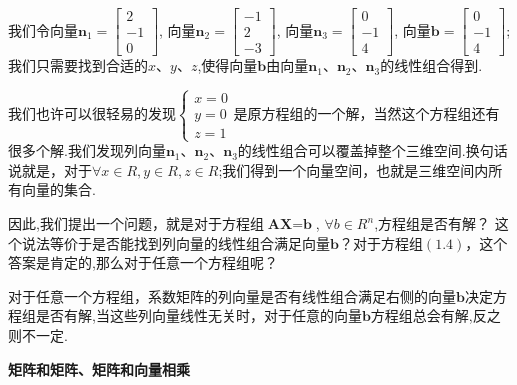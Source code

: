 \documentclass[oneside]{book}
\begin{document}
	我们令向量$
	\textbf{n}_{1}
	=
	\left[
	\begin{array}{c}
		2 \\
		-1\\
		0
	\end{array}
	\right]
	$,
	向量$
	\textbf{n}_{2}
	=
	\left[
	\begin{array}{c}
		-1 \\
		2\\
		-3
	\end{array}
	\right] 
	$,
	向量$
	\textbf{n}_{3}
	=
	\left[
	\begin{array}{c}
		0\\
		-1\\
		4
	\end{array}
	\right] 
	$,
	向量$
	\textbf{b}
	=
	\left[
	\begin{array}{c}
		0\\
		-1\\
		4
	\end{array}
	\right] 
	$;
	我们只需要找到合适的$x、y、z$,使得向量$\textbf{b}$由向量$\textbf{n}_{1}$、$\textbf{n}_{2}$、$\textbf{n}_{3}$的线性组合得到.
	
	我们也许可以很轻易的发现$ \left\{
	\begin{array}{c}
		x=0\\
		y=0\\
		z=1
	\end{array}
	\right. $是原方程组的一个解，当然这个方程组还有很多个解.我们发现列向量$\textbf{n}_{1}$、$\textbf{n}_{2}$、$\textbf{n}_{3}$的线性组合可以覆盖掉整个三维空间.换句话说就是，对于$ \forall x\in R,y\in R,z\in R$;我们得到一个向量空间，也就是三维空间内所有向量的集合.
	
	因此,我们提出一个问题，就是对于方程组$ \textbf{AX}=\textbf{b} $, $ \forall b\in R^{n} $,方程组是否有解？
	这个说法等价于是否能找到列向量的线性组合满足向量$ \textbf{b} $？对于方程组$ (1.4) $，这个答案是肯定的,那么对于任意一个方程组呢？
	
	对于任意一个方程组，系数矩阵的列向量是否有线性组合满足右侧的向量$ \textbf{b} $决定方程组是否有解,当这些列向量线性无关时，对于任意的向量$ \textbf{b} $方程组总会有解,反之则不一定.
	
	\textbf{矩阵和矩阵、矩阵和向量相乘}
	
\end{document}
